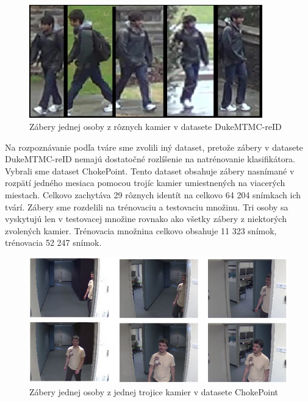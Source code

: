 \begin{figure}[H]
\centerline{\includegraphics[width=0.9\textwidth]{images/duke_same}}
\caption[Ukážka datasetu]{Zábery jednej osoby z rôznych kamier v datasete DukeMTMC-reID}
\label{obr:duke_same}
\end{figure}


Na rozpoznávanie podľa tváre sme zvolili iný dataset, pretože zábery v datasete DukeMTMC-reID nemajú dostatočné rozlíšenie na natrénovanie klasifikátora.
Vybrali sme dataset ChokePoint. 
Tento dataset obsahuje zábery nasnímané v rozpätí jedného mesiaca pomocou trojíc kamier umiestnených na viacerých miestach.
Celkovo zachytáva 29 rôznych identít na celkovo 64 204 snímkach ich tvárí.
Zábery sme rozdelili na trénovaciu a testovaciu množinu.
Tri osoby sa vyskytujú len v testovacej množine rovnako ako všetky zábery z niektorých zvolených kamier.
Trénovacia množnina celkovo obsahuje 11 323 snímok, trénovacia 52 247 snímok.

\begin{figure}[H]
\centerline{\includegraphics[width=1\textwidth]{images/chokepoint_same}}
\caption[Ukážka datasetu]{Zábery jednej osoby z jednej trojice kamier v datasete ChokePoint}
\label{obr:choke_same}
\end{figure}

